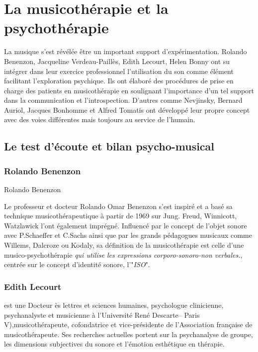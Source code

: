   
\section{La musicothérapie et la psychothérapie}
\label{musicothEtpsycho}

	 La musique s'est révélée  être un important support d'expérimentation.
	 Rolando Benenzon, Jacqueline Verdeau-Paillès, Edith
         Lecourt, Helen Bonny ont su intégrer dans leur exercice professionnel l'utilisation du son comme
          élément facilitant l'exploration psychique. 
	  Ils ont élaboré des procédures de prise en charge des patients en 
	  musicothérapie en soulignant  
	   l'importance d'un tel support dans la  communication et
           l'introspection.
           D'autres comme Nevjinsky, Bernard Auriol, Jacques Bonhomme
           et Alfred Tomatis ont développé leur propre concept avec
           des voies différentes mais toujours au service de l'humain. 

\subsection{Le test d'écoute et bilan psycho-musical}
	  
\subsubsection{Rolando Benenzon}
Rolando Benenzon
	  
	  \label{benenzon}
	  Le professeur et docteur Rolando Omar Benenzon s'est inspiré et a basé sa technique 
	  musicothérapeutique à partir de 1969 
	  sur Jung.  Freud, Winnicott, Watzlawick l'ont également imprégné. 
	  Influencé par le concept de l'objet sonore  avec P.Schaeffer et C.Sachs 
	  ainsi que par les grands pédagogues musicaux comme Willems,
          Dalcroze ou Kodaly, sa définition de la musicothérapie est celle d'une musico-psychothérapie  
	  \emph{\textsl{qui utilise les expressions corporo-sonoro-non verbales.}}, 
	  centrée sur le concept d'identité sonore, l'"\textit{ISO}".

        \subsubsection{Edith Lecourt} est une Docteur ès lettres et sciences 
        humaines, psychologue clinicienne, psychanalyste et musicienne à l'Université René Descarte-- Paris 
        V),musicothérapeute, cofondatrice  et vice-présidente de
        l'Association française de musicothérapeute. Ses recherches
        actuelles portent sur la psychanalyse de groupe, les
        dimensions subjectives du sonore  et l'émotion esthétique en thérapie.
    
